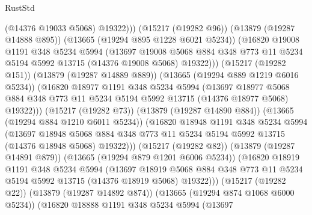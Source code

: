 \begin{lexlean}{RustStd}
\begin{coremodule}
                      (@14376 @19033 @5068)
                      @19322)))
                (@15217 (@19282 @96))
                (@13879 (@19287 @14888 @895))
                (@13665 (@19294 @895 @1228 @6021 @5234))
                (@16820
                  @19008
                  @1191
                  @348
                  @5234
                  @5994
                  (@13697
                    @19008
                    @5068
                    @884
                    @348
                    @773
                    @11
                    @5234
                    @5194
                    @5992
                    @13715
                    (@14376 @19008 @5068)
                    @19322)))
              (@15217 (@19282 @151))
              (@13879 (@19287 @14889 @889))
              (@13665 (@19294 @889 @1219 @6016 @5234))
              (@16820
                @18977
                @1191
                @348
                @5234
                @5994
                (@13697
                  @18977
                  @5068
                  @884
                  @348
                  @773
                  @11
                  @5234
                  @5194
                  @5992
                  @13715
                  (@14376 @18977 @5068)
                  @19322)))
            (@15217 (@19282 @73))
            (@13879 (@19287 @14890 @884))
            (@13665 (@19294 @884 @1210 @6011 @5234))
            (@16820
              @18948
              @1191
              @348
              @5234
              @5994
              (@13697
                @18948
                @5068
                @884
                @348
                @773
                @11
                @5234
                @5194
                @5992
                @13715
                (@14376 @18948 @5068)
                @19322)))
          (@15217 (@19282 @82))
          (@13879 (@19287 @14891 @879))
          (@13665 (@19294 @879 @1201 @6006 @5234))
          (@16820
            @18919
            @1191
            @348
            @5234
            @5994
            (@13697
              @18919
              @5068
              @884
              @348
              @773
              @11
              @5234
              @5194
              @5992
              @13715
              (@14376 @18919 @5068)
              @19322)))
        (@15217 (@19282 @22))
        (@13879 (@19287 @14892 @874))
        (@13665 (@19294 @874 @1068 @6000 @5234))
        (@16820
          @18888
          @1191
          @348
          @5234
          @5994
          (@13697

\end{coremodule}
\end{lexlean}
